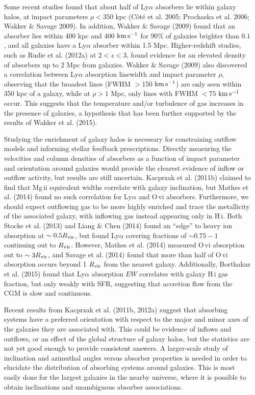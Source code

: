 Some recent studies found that about half of Ly$\alpha$ absorbers lie within galaxy halos, at impact parameters $\rho<350$ kpc (C\^{o}t\'{e} et al. 2005; Prochaska et al. 2006; Wakker $\&$ Savage 2009). In addition, Wakker $\&$ Savage (2009) found that an absorber lies within 400 kpc and 400 $\rm km\, s^{-1}$ for $90\%$ of galaxies brighter than $0.1$\Lstar, and all galaxies have a Ly$\alpha$ absorber within 1.5 Mpc. Higher-redshift studies, such as Rudie et al. (2012a) at $2<z<3$, found evidence for an elevated density of absorbers up to 2 Mpc from galaxies. Wakker $\&$ Savage (2009) also discovered a correlation between Ly$\alpha$ absorption linewidth and impact parameter $\rho$, observing that the broadest lines (FWHM $>$150 $\rm km\, s^{-1}$) are only seen within 350 kpc of a galaxy, while at $\rho>1$ Mpc, only lines with FWHM $<75$ $\rm km\, s^{-1}$ occur. This suggests that the temperature and/or turbulence of gas increases in the presence of galaxies, a hypothesis that has been further supported by the results of Wakker et al. (2015). 

Studying the enrichment of galaxy halos is necessary for constraining outflow models and informing stellar feedback prescriptions. Directly measuring the velocities and column densities of absorbers as a function of impact parameter and orientation around galaxies would provide the clearest evidence of inflow or outflow activity, but results are still uncertain. Kacprzak et al. (2011b) claimed to find that Mg\,{\sc ii} equivalent widths correlate with galaxy inclination, but Mathes et al. (2014) found no such correlation for Ly$\alpha$ and O\,{\sc vi} absorbers. Furthermore, we should expect outflowing gas to be more highly enriched and trace the metallicity of the associated galaxy, with inflowing gas instead appearing only in H\,{\sc i}. Both Stocke et al. (2013) and Liang $\&$ Chen (2014) found an ``edge'' to heavy ion absorption at $\sim0.5R_{\rm vir}$, but found Ly$\alpha$ covering fractions of $\sim0.75-1$ continuing out to $R_{\rm vir}$. However, Mathes et al. (2014) measured O\,{\sc vi} absorption out to $\sim3 R_{\rm vir}$, and Savage et al. (2014) found that more than half of O\,{\sc vi} absorption occurs beyond 1 $R_{\rm vir}$ from the nearest galaxy. Additionally, Borthakur et al. (2015) found that Ly$\alpha$ absorption $EW$ correlates with galaxy H\,{\sc i} gas fraction, but only weakly with SFR, suggesting that accretion flow from the CGM is slow and continuous.

Recent results from Kacprzak et al. (2011b, 2012a) suggest that absorbing systems have a preferred orientation with respect to the major and minor axes of the galaxies they are associated with. This could be evidence of inflows and outflows, or an effect of the global structure of galaxy halos, but the statistics are not yet good enough to provide consistent answers. A larger-scale study of inclination and azimuthal angles versus absorber properties is needed in order to elucidate the distribution of absorbing systems around galaxies. This is most easily done for the largest galaxies in the nearby universe, where it is possible to obtain inclinations and unambiguous absorber associations. 

